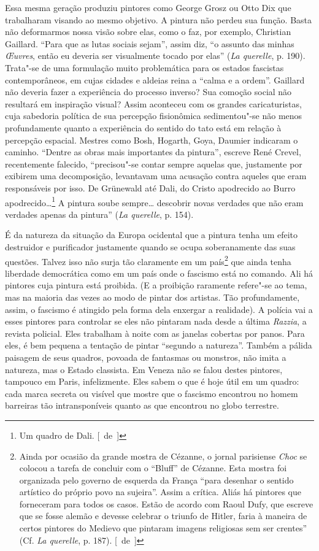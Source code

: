Essa mesma geração produziu pintores como George Grosz ou Otto Dix que
trabalharam visando ao mesmo objetivo. A pintura não perdeu sua função.
Basta não deformarmos nossa visão sobre elas, como o faz, por
exemplo, Christian Gaillard. ``Para que as lutas sociais sejam'', assim
diz, ``o assunto das minhas \emph{\OE uvres}, então eu deveria ser
visualmente tocado por elas'' (\emph{La querelle}, p. 190). Trata"-se de
uma formulação muito problemática para os estados fascistas contemporâneos, em cujas cidades e aldeias reina a
``calma e a ordem''. Gaillard não
deveria fazer a experiência do processo inverso? Sua comoção social não
resultará em inspiração visual? Assim aconteceu com os grandes
caricaturistas, cuja sabedoria política de sua percepção fisionômica
sedimentou"-se não menos profundamente quanto a experiência do sentido do
tato está em relação à percepção espacial. Mestres como Bosh, Hogarth,
Goya, Daumier indicaram o caminho. ``Dentre as obras mais importantes da
pintura'', escreve René Crevel, recentemente falecido, ``precisou"-se
contar sempre aquelas que, justamente por exibirem uma
decomposição, levantavam uma acusação contra aqueles que eram responsáveis por isso. De Grünewald
até Dali, do Cristo apodrecido ao Burro apodrecido\ldots{}\footnote{Um quadro de
  Dali. [~de~]} A pintura soube sempre\ldots{} descobrir novas verdades que não
eram verdades apenas da pintura'' (\emph{La querelle}, p. 154).

É da natureza da situação da Europa ocidental que a pintura tenha um efeito destruidor e purificador justamente quando se ocupa soberanamente das suas questões.
Talvez isso não surja tão claramente em um
país\footnote{Ainda por ocasião da grande mostra de Cézanne, o jornal
  parisiense \emph{Choc} se colocou a tarefa de concluir com o ``Bluff'' de
  Cézanne. Esta mostra foi organizada pelo governo de esquerda da França
  ``para desenhar o sentido artístico do próprio povo na sujeira''.
  Assim a crítica. Aliás há pintores que forneceram para todos os casos.
  Estão de acordo com Raoul Dufy, que escreve que se fosse alemão e
  devesse celebrar o triunfo de Hitler, faria à maneira de certos
  pintores do Medievo que pintaram imagens religiosas sem ser
  crentes'' (Cf. \emph{La querelle}, p. 187). [~de~]} que ainda tenha liberdade
democrática como em um país onde o fascismo está no comando. Ali há
pintores cuja pintura está proibida. (E a proibição raramente refere"-se
ao tema, mas na maioria das vezes ao modo de pintar dos artistas. Tão
profundamente, assim, o fascismo é atingido pela forma dela enxergar a realidade). A
polícia vai a esses pintores para controlar se eles não pintaram nada
desde a última \emph{Razzia}, a revista policial. Eles trabalham à noite
com as janelas cobertas por panos. Para eles, é bem pequena a tentação
de pintar ``segundo a natureza''. Também a pálida paisagem de seus
quadros, povoada de fantasmas ou monstros, não imita a
natureza, mas o Estado classista. Em Veneza não se falou destes
pintores, tampouco em Paris, infelizmente. Eles sabem o que é hoje útil
em um quadro: cada marca secreta ou visível que mostre que o fascismo
encontrou no homem barreiras tão intransponíveis quanto as que encontrou no globo
terrestre.
